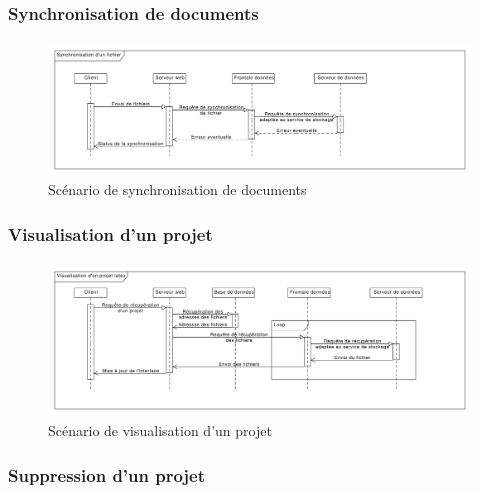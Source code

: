\documentclass[a4paper,12pt]{article}
\begin{document}
\newpage
\subsubsection{Synchronisation de documents}
\paragraph{}
\begin{figure}[!ht]
\begin{center}
  \includegraphics[width=1\textwidth, angle=90]{./Diagramme/data_sync.pdf}
\end{center}
  \caption{Scénario de synchronisation de documents}
  \label{sync}
\end{figure}

\newpage
\subsubsection{Visualisation d'un projet}
\paragraph{}
\begin{figure}[!ht]
\begin{center}
  \includegraphics[width=1\textwidth, angle=90]{./Diagramme/project_visu.pdf}
\end{center}
  \caption{Scénario de visualisation d'un projet}
  \label{view}
\end{figure}

\newpage
\subsubsection{Suppression d'un projet}
\end{document}
